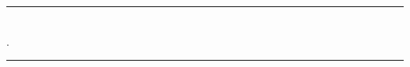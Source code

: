 \vspace*{0.35\textheight}
\begin{center}
\rule{0.6\textwidth}{0.4pt}\\[6pt]
.\\[2pt]
\rule{0.6\textwidth}{0.4pt}
\end{center}
